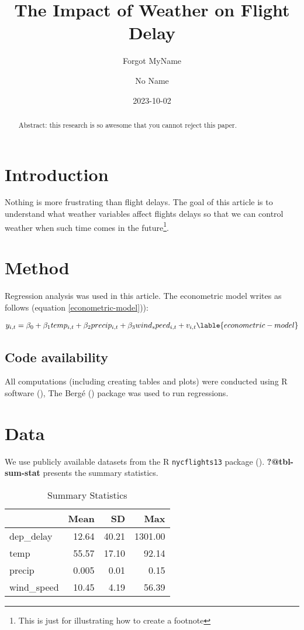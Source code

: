 \documentclass[
]{article}
\title{The Impact of Weather on Flight Delay}
\author{Forgot MyName \and No Name}
\date{2023-10-02}
\begin{document}
\maketitle
\begin{abstract}
Abstract: this research is so awesome that you cannot reject this paper.
\end{abstract}
\section{Introduction}\label{introduction}

Nothing is more frustrating than flight delays. The goal of this article
is to understand what weather variables affect flights delays so that we
can control weather when such time comes in the future\footnote{This is
  just for illustrating how to create a footnote}.

\section{Method}\label{method}

Regression analysis was used in this article. The econometric model
writes as follows (equation \ref{econometric-model})):

\begin{align}
y_{i,t} = \beta_0 + \beta_1 temp_{i,t} + \beta_2 precip_{i,t} + \beta_3 wind_speed_{i,t} + v_{i,t} \lable{econometric-model}
\end{align}

\subsection{Code availability}\label{code-availability}

All computations (including creating tables and plots) were conducted
using R software (), The Bergé
() package was used to run regressions.

\section{Data}\label{data}

We use publicly available datasets from the R \texttt{nycflights13}
package ().
\textbf{?@tbl-sum-stat} presents the summary statistics.

\begin{table}
\caption{Summary Statistics}\tabularnewline

\centering
\begin{tabular}[t]{lrrr}
\toprule
  & Mean & SD & Max\\
\midrule
dep\_delay & \num{12.64} & \num{40.21} & \num{1301.00}\\
temp & \num{55.57} & \num{17.10} & \num{92.14}\\
precip & \num{0.005} & \num{0.01} & \num{0.15}\\
wind\_speed & \num{10.45} & \num{4.19} & \num{56.39}\\
\bottomrule
\end{tabular}
\end{table}
\end{document}
